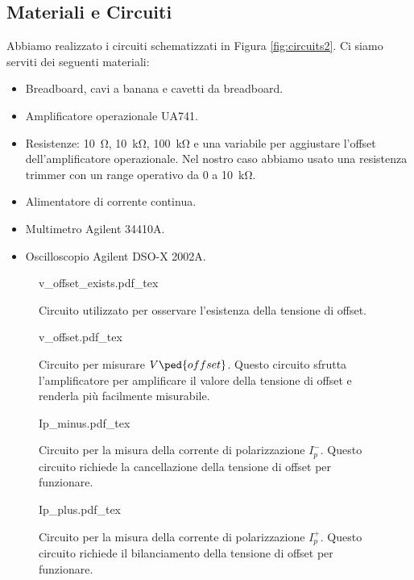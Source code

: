 \subsection{Materiali e Circuiti}

Abbiamo realizzato i circuiti schematizzati in Figura \ref{fig:circuits2}.
Ci siamo serviti dei seguenti materiali:

\begin{itemize}
    \item{Breadboard, cavi a banana e cavetti da breadboard.}
    \item{Amplificatore operazionale UA741.}
    \item{Resistenze: \SI{10}{\ohm}, \SI{10}{\kilo\ohm}, \SI{100}{\kilo\ohm}
        e una variabile per aggiustare l'offset dell'amplificatore operazionale.
        Nel nostro caso abbiamo usato una resistenza trimmer con un range operativo da 0
        a \SI{10}{\kilo\ohm}.}
    \item{Alimentatore di corrente continua.}
    \item{Multimetro Agilent 34410A.}
    \item{Oscilloscopio Agilent DSO-X 2002A.}
\end{itemize}

\begin{figure*}[t]
        \centering
        \small
        \begin{subfigure}[b]{0.35\textwidth}
            \def\svgwidth{\columnwidth}
            {v_offset_exists.pdf_tex}
            \caption{Circuito utilizzato per osservare l'esistenza della tensione di offset.}
            \label{fig:v_off_exists2}
        \end{subfigure}
        \quad
        \begin{subfigure}[b]{0.48\textwidth}
            \def\svgwidth{\columnwidth}
            {v_offset.pdf_tex}
            \caption{Circuito per misurare $V\ped{offset}$. Questo circuito sfrutta l'amplificatore
                per amplificare il valore della tensione di offset e renderla più facilmente misurabile.}
            \label{fig:v_off_circ2}
        \end{subfigure}
        \quad
        \begin{subfigure}[b]{0.48\textwidth}
            \def\svgwidth{\columnwidth}
            {Ip_minus.pdf_tex}
            \caption{Circuito per la misura della corrente di polarizzazione $I_p^-$. Questo circuito
                richiede la cancellazione della tensione di offset per funzionare.}
            \label{fig:ip_minus_circ2}
        \end{subfigure}
        \quad
        \begin{subfigure}[b]{0.48\textwidth}
            \def\svgwidth{\columnwidth}
            {Ip_plus.pdf_tex}
            \caption{Circuito per la misura della corrente di polarizzazione $I_p^+$. Questo circuito
                richiede il bilanciamento della tensione di offset per funzionare.}
            \label{fig:ip_plus_circ2}
        \end{subfigure}
        \caption{Circuiti costruiti durante l'esperienza}
        \label{fig:circuits2}
\end{figure*}
